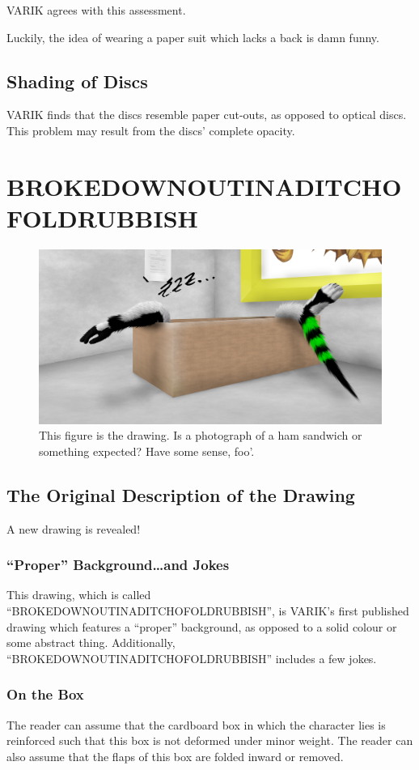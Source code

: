 \documentclass{report}
\begin{document}
VARIK agrees with this assessment.

Luckily, the idea of wearing a paper suit which lacks a back is damn funny.
\section{Shading of Discs}
VARIK finds that the discs resemble paper cut-outs, as opposed to optical discs.  This problem may result from the discs' complete opacity.
\chapter{BROKEDOWNOUTINADITCHOFOLDRUBBISH}
\begin{figure}[ht]
	\centering
	\includegraphics[width=\textwidth]{brokedownoutinaditchofoldrubbish/brokedownoutinaditchofoldrubbish.png}
	\caption[center]{This figure is the drawing.  Is a photograph of a ham sandwich or something expected?  Have some sense, foo'.}
\end{figure}
\section{The Original Description of the Drawing}
A new drawing is revealed!

\subsection{``Proper'' Background\ldots and Jokes}
This drawing, which is called ``BROKEDOWNOUTINADITCHOFOLDRUBBISH'', is VARIK's first published drawing which features a ``proper'' background, as opposed to a solid colour or some abstract thing.  Additionally, ``BROKEDOWNOUTINADITCHOFOLDRUBBISH'' includes a few jokes.

\subsection{On the Box}
The reader can assume that the cardboard box in which the character lies is reinforced such that this box is not deformed under minor weight.  The reader can also assume that the flaps of this box are folded inward or removed.
\end{document}
